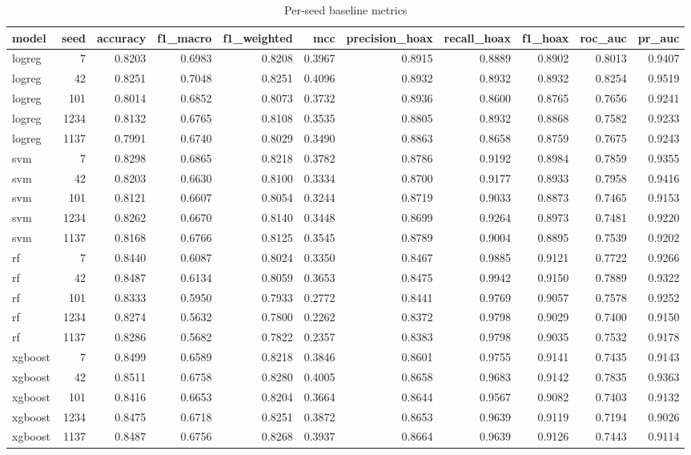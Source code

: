 \begin{table}
\caption{Per-seed baseline metrics}
\label{tab:baselines_per_seed}
\begin{tabular}{lrrrrrrrrrr}
\toprule
model & seed & accuracy & f1\_macro & f1\_weighted & mcc & precision\_hoax & recall\_hoax & f1\_hoax & roc\_auc & pr\_auc \\
\midrule
logreg & 7 & 0.8203 & 0.6983 & 0.8208 & 0.3967 & 0.8915 & 0.8889 & 0.8902 & 0.8013 & 0.9407 \\
logreg & 42 & 0.8251 & 0.7048 & 0.8251 & 0.4096 & 0.8932 & 0.8932 & 0.8932 & 0.8254 & 0.9519 \\
logreg & 101 & 0.8014 & 0.6852 & 0.8073 & 0.3732 & 0.8936 & 0.8600 & 0.8765 & 0.7656 & 0.9241 \\
logreg & 1234 & 0.8132 & 0.6765 & 0.8108 & 0.3535 & 0.8805 & 0.8932 & 0.8868 & 0.7582 & 0.9233 \\
logreg & 1137 & 0.7991 & 0.6740 & 0.8029 & 0.3490 & 0.8863 & 0.8658 & 0.8759 & 0.7675 & 0.9243 \\
svm & 7 & 0.8298 & 0.6865 & 0.8218 & 0.3782 & 0.8786 & 0.9192 & 0.8984 & 0.7859 & 0.9355 \\
svm & 42 & 0.8203 & 0.6630 & 0.8100 & 0.3334 & 0.8700 & 0.9177 & 0.8933 & 0.7958 & 0.9416 \\
svm & 101 & 0.8121 & 0.6607 & 0.8054 & 0.3244 & 0.8719 & 0.9033 & 0.8873 & 0.7465 & 0.9153 \\
svm & 1234 & 0.8262 & 0.6670 & 0.8140 & 0.3448 & 0.8699 & 0.9264 & 0.8973 & 0.7481 & 0.9220 \\
svm & 1137 & 0.8168 & 0.6766 & 0.8125 & 0.3545 & 0.8789 & 0.9004 & 0.8895 & 0.7539 & 0.9202 \\
rf & 7 & 0.8440 & 0.6087 & 0.8024 & 0.3350 & 0.8467 & 0.9885 & 0.9121 & 0.7722 & 0.9266 \\
rf & 42 & 0.8487 & 0.6134 & 0.8059 & 0.3653 & 0.8475 & 0.9942 & 0.9150 & 0.7889 & 0.9322 \\
rf & 101 & 0.8333 & 0.5950 & 0.7933 & 0.2772 & 0.8441 & 0.9769 & 0.9057 & 0.7578 & 0.9252 \\
rf & 1234 & 0.8274 & 0.5632 & 0.7800 & 0.2262 & 0.8372 & 0.9798 & 0.9029 & 0.7400 & 0.9150 \\
rf & 1137 & 0.8286 & 0.5682 & 0.7822 & 0.2357 & 0.8383 & 0.9798 & 0.9035 & 0.7532 & 0.9178 \\
xgboost & 7 & 0.8499 & 0.6589 & 0.8218 & 0.3846 & 0.8601 & 0.9755 & 0.9141 & 0.7435 & 0.9143 \\
xgboost & 42 & 0.8511 & 0.6758 & 0.8280 & 0.4005 & 0.8658 & 0.9683 & 0.9142 & 0.7835 & 0.9363 \\
xgboost & 101 & 0.8416 & 0.6653 & 0.8204 & 0.3664 & 0.8644 & 0.9567 & 0.9082 & 0.7403 & 0.9132 \\
xgboost & 1234 & 0.8475 & 0.6718 & 0.8251 & 0.3872 & 0.8653 & 0.9639 & 0.9119 & 0.7194 & 0.9026 \\
xgboost & 1137 & 0.8487 & 0.6756 & 0.8268 & 0.3937 & 0.8664 & 0.9639 & 0.9126 & 0.7443 & 0.9114 \\
\bottomrule
\end{tabular}
\end{table}
